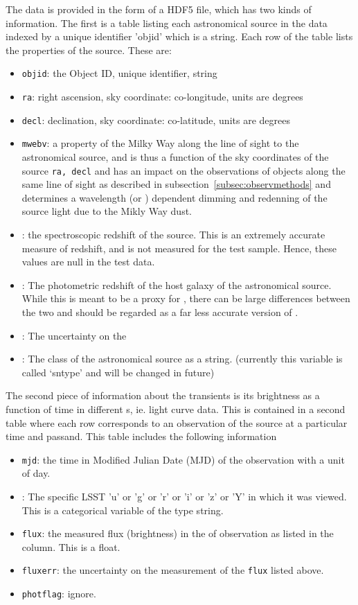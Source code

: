 \documentclass[\docopts]{\docclass}
\begin{document}
The {\plasticc} data is provided in the form of a HDF5 file, which has two kinds of information. The first
is a table listing each astronomical source in the data indexed by a unique identifier 'objid' which is a string. Each row of the table lists the properties of the source. These are: 
\begin{itemize}
\item {\tt objid}: the Object ID, unique identifier, string
\item {\tt ra}: right ascension, sky coordinate: co-longitude, units are degrees
\item {\tt decl}: declination, sky coordinate: co-latitude, units are degrees
\item {\tt mwebv}: a property of the Milky Way along the line of sight to the astronomical source, and is thus a function of the sky coordinates of the source {\tt ra, decl} and has an impact on the observations of objects along the same line of sight as described in subsection~\ref{subsec:observmethods} and determines a wavelength (or {\passband}) dependent dimming and redenning of the source light due to the Mikly Way dust.  
\item {\specz}: the spectroscopic redshift of the source. This is an extremely accurate measure of redshift, 
    and is not measured for the test sample. Hence, these values are null in the test data.
\item {\hostphotoz} : The photometric redshift of the host galaxy of the astronomical source. While this is meant to be a proxy for {\specz}, there can be large differences between the two and should be regarded as a far less accurate version of {\specz}. 
\item {\hostphotozerr} : The uncertainty on the {\hostphotoz}
\item {\class} : The class of the astronomical source as a string. (currently this variable is called `sntype' and will be changed in future)
\end{itemize}

The second piece of information about the transients is its brightness as a function of time in different {\passband}s, ie. light curve data. This is contained in a second table where each row corresponds to an observation of the source at a particular time and passand.  This table includes the following information
\begin{itemize}
\item {\tt mjd}: the time in Modified Julian Date (MJD) of the observation with a unit of day.
\item {\passband} : The specific LSST {\passband} 'u' or 'g' or 'r' or 'i' or 'z' or 'Y' in which it was viewed. This is a categorical variable of the type string. 
\item {\tt flux}: the measured flux (brightness) in the {\passband} of observation as listed in the {\passband} column. This is a float.
\item {\tt fluxerr}: the uncertainty on the measurement of the {\tt flux}  listed above.
\item {\tt photflag}: ignore.
\end{itemize}
\end{document}
